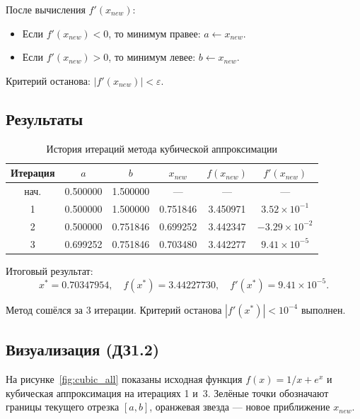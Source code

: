 После вычисления $f'(x_{new})$:
\begin{itemize}
    \item Если $f'(x_{new}) < 0$, то минимум правее: $a \leftarrow x_{new}$.
    \item Если $f'(x_{new}) > 0$, то минимум левее: $b \leftarrow x_{new}$.
\end{itemize}
Критерий останова: $|f'(x_{new})| < \varepsilon$.

\subsection{Результаты}

\begin{table}[H]
    \centering
    \caption{История итераций метода кубической аппроксимации}
    \label{tab:cubic_history}
    \begin{tabular}{|c|c|c|c|c|c|}
        \hline
        \textbf{Итерация} & \textbf{$a$} & \textbf{$b$} & \textbf{$x_{new}$} & \textbf{$f(x_{new})$} & \textbf{$f'(x_{new})$} \\
        \hline
        нач. & 0.500000 & 1.500000 & --- & --- & --- \\
        1 & 0.500000 & 1.500000 & 0.751846 & 3.450971 & $3.52 \times 10^{-1}$ \\
        2 & 0.500000 & 0.751846 & 0.699252 & 3.442347 & $-3.29 \times 10^{-2}$ \\
        3 & 0.699252 & 0.751846 & 0.703480 & 3.442277 & $9.41 \times 10^{-5}$ \\
        \hline
    \end{tabular}
\end{table}

Итоговый результат:
\begin{equation}\label{eq:cubic_result}
    x^* = 0.70347954, \quad f(x^*) = 3.44227730, \quad f'(x^*) = 9.41 \times 10^{-5}.
\end{equation}

Метод сошёлся за 3 итерации. Критерий останова $|f'(x^*)| < 10^{-4}$ выполнен.

\subsection{Визуализация (ДЗ1.2)}

На рисунке~\ref{fig:cubic_all} показаны исходная функция $f(x) = 1/x + e^x$ и кубическая аппроксимация на итерациях 1 и~3. Зелёные точки обозначают границы текущего отрезка $[a, b]$, оранжевая звезда --- новое приближение $x_{new}$.

